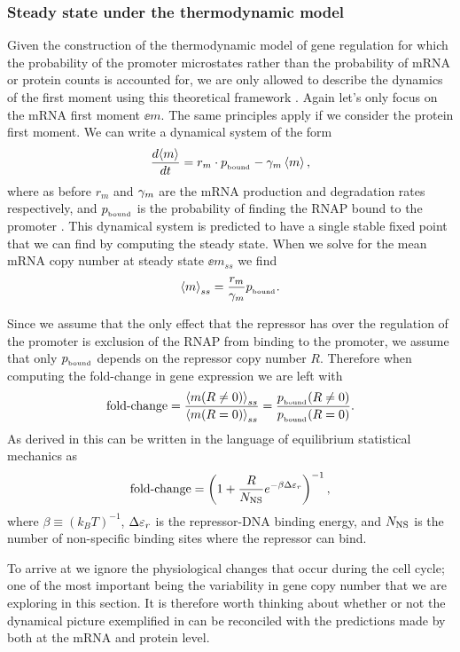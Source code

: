 \subsubsection{Steady state under the thermodynamic model}

Given the construction of the thermodynamic model of gene regulation for which
the probability of the promoter microstates rather than the probability of mRNA
or protein counts is accounted for,  we are only allowed to describe the
dynamics of the first moment using this theoretical framework
\cite{Phillips2015}. Again let's only focus on the mRNA first moment $\ee{m}$.
The same principles apply if we consider the protein first moment. We can write
a dynamical system of the form
\begin{equation}
  {d{\left\langle m \right\rangle} \over dt} = r_m \cdot p_{_\text{bound}} - \gamma _m \left\langle m \right\rangle,
\end{equation}
where as before $r_m$ and $\gamma _m$ are the mRNA production and degradation rates
respectively, and $p_{_\text{bound}}$ is the probability of finding the RNAP bound to the
promoter \cite{Bintu2005a}. This dynamical system is predicted to have a single
stable fixed point that we can find by computing the steady state. When we
solve for the mean mRNA copy number at steady state $\ee{m}_{ss}$ we find
\begin{equation}
  \left\langle m \right\rangle_{ss} = {r_m \over \gamma _m} p_{_\text{bound}}.
\end{equation}

Since we assume that the only effect that the repressor has over the regulation
of the promoter is exclusion of the RNAP from binding to the promoter, we
assume that only $p_{_\text{bound}}$ depends on the repressor copy number $R$. Therefore
when computing the fold-change in gene expression we  are left with
\begin{equation}
  \text{fold-change} = {\left\langle m (R \neq 0) \right\rangle_{ss} \over \left\langle m (R = 0) \right\rangle_{ss}}
              = {p_{_\text{bound}} (R \neq 0) \over p_{_\text{bound}} (R = 0)}.
\end{equation}
As derived in \cite{Garcia2011c} this can be written in the language of
equilibrium statistical mechanics as
\begin{equation}
  \text{fold-change} = \left(1 + {R \over N_\text{NS}}e^{-\beta \Delta\varepsilon_r}  \right)^{-1},
  \label{seq_fold_change_thermo}
\end{equation}
where $\beta \equiv (k_BT)^{-1}$, $\Delta\varepsilon_r$ is the repressor-DNA binding energy,
and $N_\text{NS}$ is the number of non-specific binding sites where the repressor can
bind.

To arrive at  we ignore the physiological changes
that occur during the cell cycle; one of the most important being the
variability in gene copy number that we are exploring in this section. It is
therefore worth thinking about whether or not the dynamical picture exemplified
in  can be reconciled with the predictions made by
 both at the mRNA and protein level.

